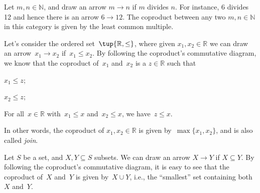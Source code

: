 \begin{example}
Let $m,n\in \mathbb{N}$, and draw an arrow $m\to n$ if $m$ divides $n$. For instance, 6 divides 12 and hence there is an arrow $6\to 12$. The coproduct between any two $m,n\in \mathbb{N}$ in this category is given by the least common multiple. 
\end{example}

\begin{example}
Let's consider the ordered set~$\tup{\mathbb{R},\leq}$, where given $x_1,x_2\in \mathbb{R}$ we can draw an arrow~$x_1\to x_2$ if~$x_1\leq x_2$. By following the coproduct's commutative diagram, we know that the coproduct of~$x_1$ and~$x_2$ is a $z\in \mathbb{R}$ such that
\begin{compactitem}
\item $x_1\leq z$;
\item $x_2\leq z$;
\item For all~$x\in \mathbb{R}$ with~$x_1\leq x$ and~$x_2\leq x$, we have~$z\leq x$.
\end{compactitem}
In other words, the coproduct of $x_1,x_2\in \mathbb{R}$ is given by~$\max\{x_1,x_2\}$, and is also called \emph{join}.
\end{example}

\begin{example}
Let $S$ be a set, and $X,Y\subseteq S$ subsets. We can draw an arrow $X\to Y$ if $X\subseteq Y$. By following the coproduct's commutative diagram, it is easy to see that the coproduct of~$X$ and~$Y$ is given by~$X\cup Y$, i.e., the ``smallest'' set containing both~$X$ and~$Y$.
\end{example}

